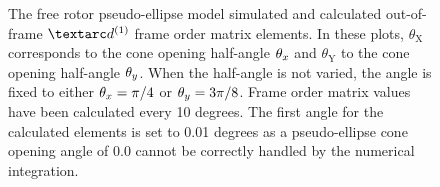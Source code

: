 \begin{figure}
\begin{tabular}{@{}cc@{}}
  \end{tabular}
  \caption[Free rotor pseudo-ellipse simulated and calculated out-of-frame Daeg$^{(1)}$ elements.]{
    The free rotor pseudo-ellipse model simulated and calculated out-of-frame $\FOone$ frame order matrix elements.
    In these plots, $\theta_\textrm{X}$ corresponds to the cone opening half-angle $\theta_x$ and $\theta_\textrm{Y}$ to the cone opening half-angle $\theta_y$.
    When the half-angle is not varied, the angle is fixed to either $\theta_x = \pi/4$ or $\theta_y = 3\pi/8$.
    Frame order matrix values have been calculated every 10 degrees.
    The first angle for the calculated elements is set to 0.01 degrees as a pseudo-ellipse cone opening angle of 0.0 cannot be correctly handled by the numerical integration.
  }
  \label{fig: simulated and calculated out-of-frame 1st degree pseudo-ellipse, free rotor frame order}
\end{figure}

